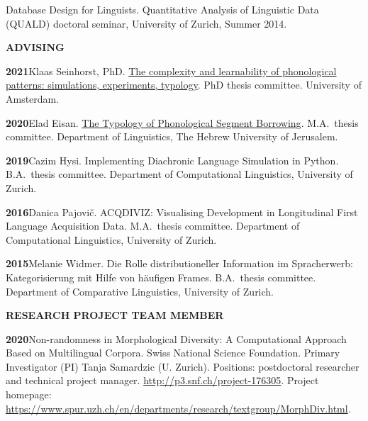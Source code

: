 \documentclass[11pt]{article}
\newcommand{\hangpara}{
 \setlength{\parindent}{0in} %
 \hangindent=0.42in %
}
\begin{document}
\vskip 6pt
\hangpara Database Design for Linguists. Quantitative Analysis of Linguistic Data (QUALD) doctoral seminar, University of Zurich, Summer 2014.

\vskip 20pt
\begin{flushleft}
{\bf ADVISING}
\end{flushleft}

\hangpara
{\bf 2021}\hspace{1ex}Klaas Seinhorst, PhD. \href{https://www.fon.hum.uva.nl/klaas/KlaasSeinhorstDissertation.pdf}{The complexity and learnability of phonological patterns: simulations, experiments, typology}. PhD thesis committee. University of Amsterdam.

\hangpara
\vskip 6pt
{\bf 2020}\hspace{1ex}Elad Eisan. \href{https://www.researchgate.net/publication/341734023_The_Typology_of_Phonological_Segment_Borrowing}{
The Typology of Phonological Segment Borrowing}. M.A.\ thesis committee. Department of Linguistics, The Hebrew University of Jerusalem.

\hangpara
\vskip 6pt
{\bf 2019}\hspace{1ex}Cazim Hysi. Implementing Diachronic Language Simulation in Python. B.A.\ thesis committee. Department of Computational Linguistics, University of Zurich.

\hangpara
\vskip 6pt
{\bf 2016}\hspace{1ex}Danica Pajovi{\v c}. ACQDIVIZ: Visualising Development in Longitudinal First Language Acquisition Data. M.A.\ thesis committee. Department of Computational Linguistics, University of Zurich.

\vskip 6pt
\hangpara
{\bf 2015}\hspace{1ex}Melanie Widmer. Die Rolle distributioneller Information im Spracherwerb: Kategorisierung mit Hilfe von h{\"a}ufigen Frames. B.A.\ thesis committee. Department of Comparative Linguistics, University of Zurich.


\vskip 20pt
\begin{flushleft}
{\bf RESEARCH PROJECT TEAM MEMBER}
\end{flushleft}

\hangpara
{\bf 2020}\hspace{1ex}Non-randomness in Morphological Diversity: A Computational Approach Based on Multilingual Corpora. Swiss National Science Foundation. Primary Investigator (PI) Tanja Samardzic (U. Zurich). Positions: postdoctoral researcher and technical project manager. \url{http://p3.snf.ch/project-176305}. Project homepage: \url{https://www.spur.uzh.ch/en/departments/research/textgroup/MorphDiv.html}.
\end{document}
